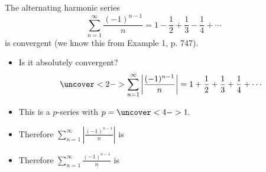 \begin{frame}
\begin{example} %
The alternating harmonic series
\abovedisplayskip=0pt
\belowdisplayskip=0pt
\[
\sum_{n=1}^\infty \frac{(-1)^{n-1}}{n} = 1 - \frac{1}{2} + \frac{1}{3} - \frac{1}{4} + \cdots%
\]
is convergent (we know this from Example 1, p. 747).
\begin{itemize}
\item<2->  Is it absolutely convergent?
\[
\uncover<2->{%
\sum_{n=1}^\infty \left| \frac{(-1)^{n-1}}{n}\right|  = 1 + \frac{1}{2} + \frac{1}{3} + \frac{1}{4} + \cdots%
}%
\]
\item<3->  This is a $p$-series with \alert<handout:0| 3-4>{$p = \uncover<4->{1.}$}
\item<5->  Therefore $\sum_{n=1}^\infty \left|\frac{(-1)^{n-1}}{n}\right|$ is 
\item<5->  Therefore $\sum_{n=1}^\infty \frac{(-1)^{n-1}}{n}$ is 
\end{itemize}
\end{example}
\end{frame}
